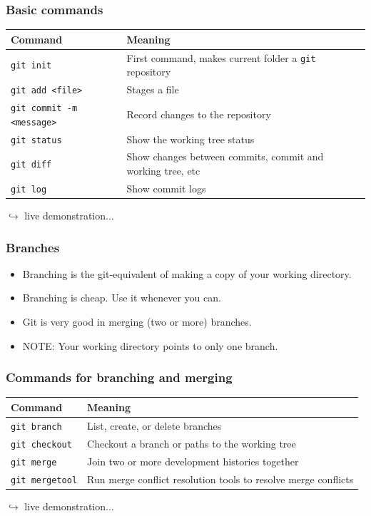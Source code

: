 \documentclass{beamer}
\begin{document}
\begin{frame}
\frametitle{Basic commands}
\begin{table}
\begin{tabularx}{\textwidth}{l|X}
Command & Meaning \\
 \hline
 \texttt{git init} & First command, makes current folder a \texttt{git} repository\\
 \texttt{git add <file>} & Stages a file\\
 \texttt{git commit -m <message>} & Record changes to the repository\\
 \texttt{git status} & Show the working tree status\\
 \texttt{git diff} & Show changes between commits, commit and working tree, etc\\
 \texttt{git log} & Show commit logs\\
\end{tabularx}
\end{table}
\hfill $\hookrightarrow$ live demonstration...
\end{frame}

\begin{frame}
\frametitle{Branches}
\begin{itemize}
 \item Branching is the git-equivalent of making a copy of your working
 directory.
 \item Branching is cheap.  Use it whenever you can.
 \item Git is very good in merging (two or more) branches.
 \item NOTE: Your working directory points to only one branch.
\end{itemize}
\end{frame}

\begin{frame}
\frametitle{Commands for branching and merging}
\begin{table}
\begin{tabularx}{\textwidth}{l|X}
Command & Meaning \\
 \hline
 \texttt{git branch} & List, create, or delete branches\\
 \texttt{git checkout} & Checkout a branch or paths to the working tree\\
 \texttt{git merge} & Join two or more development histories together\\
 \texttt{git mergetool} & Run merge conflict resolution tools to resolve merge conflicts\\
\end{tabularx}
\end{table}
\hfill $\hookrightarrow$ live demonstration...
\end{frame}
\end{document}

